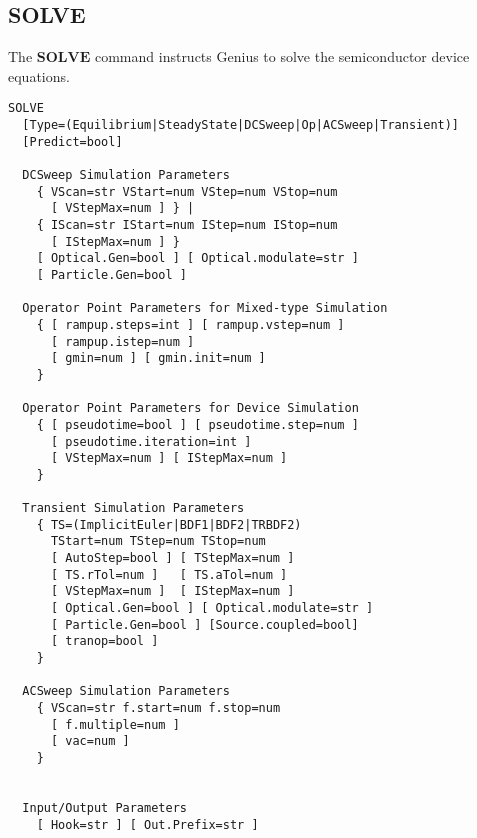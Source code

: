 \documentclass[oneside,12pt]{cgd_book}
\begin{document}
\subsection{SOLVE}
The $\mathbf{SOLVE}$
command instructs Genius to solve the semiconductor device
        equations.
\par
\begin{lstlisting}[style=GeniusCmd]
SOLVE
  [Type=(Equilibrium|SteadyState|DCSweep|Op|ACSweep|Transient)]
  [Predict=bool]

  DCSweep Simulation Parameters
    { VScan=str VStart=num VStep=num VStop=num
      [ VStepMax=num ] } |
    { IScan=str IStart=num IStep=num IStop=num
      [ IStepMax=num ] }
    [ Optical.Gen=bool ] [ Optical.modulate=str ]
    [ Particle.Gen=bool ]

  Operator Point Parameters for Mixed-type Simulation
    { [ rampup.steps=int ] [ rampup.vstep=num ]
      [ rampup.istep=num ]
      [ gmin=num ] [ gmin.init=num ]
    }

  Operator Point Parameters for Device Simulation
    { [ pseudotime=bool ] [ pseudotime.step=num ]
      [ pseudotime.iteration=int ]
      [ VStepMax=num ] [ IStepMax=num ]
    }

  Transient Simulation Parameters
    { TS=(ImplicitEuler|BDF1|BDF2|TRBDF2)
      TStart=num TStep=num TStop=num
      [ AutoStep=bool ] [ TStepMax=num ]
      [ TS.rTol=num ]   [ TS.aTol=num ]
      [ VStepMax=num ]  [ IStepMax=num ]
      [ Optical.Gen=bool ] [ Optical.modulate=str ]
      [ Particle.Gen=bool ] [Source.coupled=bool]
      [ tranop=bool ]
    }

  ACSweep Simulation Parameters
    { VScan=str f.start=num f.stop=num
      [ f.multiple=num ]
      [ vac=num ]
    }


  Input/Output Parameters
    [ Hook=str ] [ Out.Prefix=str ]
\end{lstlisting}
\end{document}
